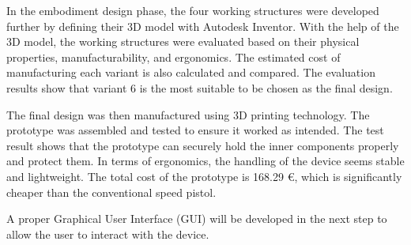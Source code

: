 In the embodiment design phase, the four working structures were developed further by defining their 3D model with Autodesk Inventor. With the help of the 3D model, the working structures were evaluated based on their physical properties, manufacturability, and ergonomics. The estimated cost of manufacturing each variant is also calculated and compared. The evaluation results show that variant 6 is the most suitable to be chosen as the final design.

The final design was then manufactured using 3D printing technology. The prototype was assembled and tested to ensure it worked as intended. The test result shows that the prototype can securely hold the inner components properly and protect them. In terms of ergonomics, the handling of the device seems stable and lightweight. The total cost of the prototype is 168.29 €, which is significantly cheaper than the conventional speed pistol.

A proper Graphical User Interface (GUI) will be developed in the next step to allow the user to interact with the device.
